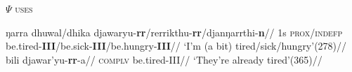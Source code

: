 \documentclass[12pt]{article}
\begin{document}
\pex\textsc{$\Psi$ uses}



\a\begingl\gla ŋarra dhuwal/dhika djawaryu-\textbf{rr}/rerrikthu-\textbf{rr}/djanŋarrthi-\textbf{n}//
\glb 1s \textsc{prox/indefp} be.tired-\textbf{III}/be.sick-\textbf{III}/be.hungry-\textbf{III}//
\glft`I'm (a bit) tired/sick/hungry'\hfill(278)//\endgl
\a\begingl\gla bili djawar'yu-\textbf{rr}-a//
\glb \textsc{complv} be.tired-III//
\glft`They're already tired'\hfill(365)//\endgl
\xe
\end{document}
